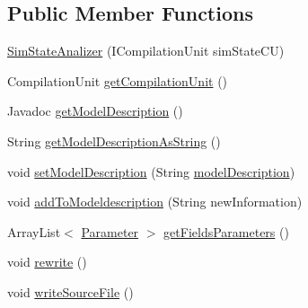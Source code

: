 \subsection*{Public Member Functions}
\begin{DoxyCompactItemize}
\item 
\hyperlink{classit_1_1isislab_1_1masonassisteddocumentation_1_1mason_1_1analizer_1_1_sim_state_analizer_acede3b0a241806c02e46b6295679ebf5}{Sim\-State\-Analizer} (I\-Compilation\-Unit sim\-State\-C\-U)
\item 
Compilation\-Unit \hyperlink{classit_1_1isislab_1_1masonassisteddocumentation_1_1mason_1_1analizer_1_1_sim_state_analizer_aae6b20597fe32345127ef55c994902cf}{get\-Compilation\-Unit} ()
\item 
Javadoc \hyperlink{classit_1_1isislab_1_1masonassisteddocumentation_1_1mason_1_1analizer_1_1_sim_state_analizer_a2043173f52faa26a4a89056aba9887fb}{get\-Model\-Description} ()
\item 
String \hyperlink{classit_1_1isislab_1_1masonassisteddocumentation_1_1mason_1_1analizer_1_1_sim_state_analizer_a26c94d581acaf2290b1dcb15350aeba0}{get\-Model\-Description\-As\-String} ()
\item 
void \hyperlink{classit_1_1isislab_1_1masonassisteddocumentation_1_1mason_1_1analizer_1_1_sim_state_analizer_a17e7eab8f806cd6a275ed1ff4c9682db}{set\-Model\-Description} (String \hyperlink{classit_1_1isislab_1_1masonassisteddocumentation_1_1mason_1_1analizer_1_1_sim_state_analizer_ae2584c7bd2e47283b4693d7a7c4b39bd}{model\-Description})
\item 
void \hyperlink{classit_1_1isislab_1_1masonassisteddocumentation_1_1mason_1_1analizer_1_1_sim_state_analizer_ac6c898d053844032c5784fe826e2d24b}{add\-To\-Modeldescription} (String new\-Information)
\item 
Array\-List$<$ \hyperlink{classit_1_1isislab_1_1masonassisteddocumentation_1_1mason_1_1analizer_1_1_parameter}{Parameter} $>$ \hyperlink{classit_1_1isislab_1_1masonassisteddocumentation_1_1mason_1_1analizer_1_1_sim_state_analizer_a7ae9354f9db7c1455dac04271d21fad0}{get\-Fields\-Parameters} ()
\item 
void \hyperlink{classit_1_1isislab_1_1masonassisteddocumentation_1_1mason_1_1analizer_1_1_sim_state_analizer_a9638ebfd96b5ecd957ff1798f15e4621}{rewrite} ()
\item 
void \hyperlink{classit_1_1isislab_1_1masonassisteddocumentation_1_1mason_1_1analizer_1_1_sim_state_analizer_a310f2f2452a5f26ea5e1f86bcbc88f56}{write\-Source\-File} ()
\item 

\end{DoxyCompactItemize}
